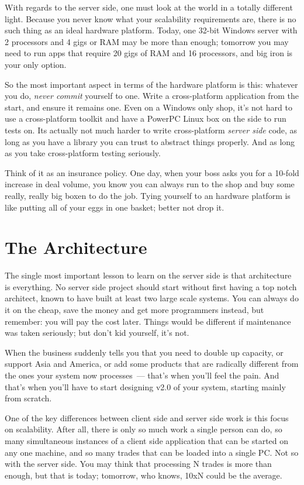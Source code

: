 \documentclass{memoir}
\begin{document}
With regards to the server side, one must look at the world in a
totally different light. Because you never know what your scalability
requirements are, there is no such thing as an ideal hardware
platform. Today, one 32-bit Windows server with 2 processors and 4
gigs or RAM may be more than enough; tomorrow you may need to run apps
that require 20 gigs of RAM and 16 processors, and big iron is your
only option.

So the most important aspect in terms of the hardware platform is
this: whatever you do, \emph{never commit} yourself to one. Write a
cross-platform application from the start, and ensure it remains
one. Even on a Windows only shop, it's not hard to use a
cross-platform toolkit and have a PowerPC Linux box on the side to run
tests on. Its actually not much harder to write cross-platform
\emph{server side} code, as long as you have a library you can trust
to abstract things properly. And as long as you take cross-platform
testing seriously.

Think of it as an insurance policy. One day, when your boss asks you
for a 10-fold increase in deal volume, you know you can always run to
the shop and buy some really, really big boxen to do the job. Tying
yourself to an hardware platform is like putting all of your eggs in
one basket; better not drop it.

\section{The Architecture}

The single most important lesson to learn on the server side is that
architecture is everything. No server side project should start
without first having a top notch architect, known to have built at
least two large scale systems. You can always do it on the cheap, save
the money and get more programmers instead, but remember: you will pay
the cost later. Things would be different if maintenance was taken
seriously; but don't kid yourself, it's not.

When the business suddenly tells you that you need to double up
capacity, or support Asia and America, or add some products that are
radically different from the ones your system now processes~--- that's
when you'll feel the pain. And that's when you'll have to start
designing v2.0 of your system, starting mainly from scratch.

One of the key differences between client side and server side work is
this focus on scalability. After all, there is only so much work a
single person can do, so many simultaneous instances of a client side
application that can be started on any one machine, and so many trades
that can be loaded into a single PC. Not so with the server side. You
may think that processing N trades is more than enough, but that is
today; tomorrow, who knows, 10xN could be the average.
\end{document}
